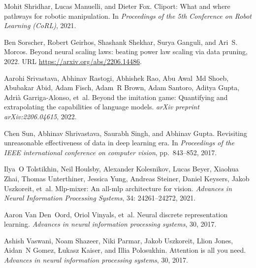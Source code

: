 \documentclass{article} %
\begin{document}
\begin{thebibliography}{61}
Mohit Shridhar, Lucas Manuelli, and Dieter Fox.
\newblock Cliport: What and where pathways for robotic manipulation.
\newblock In \emph{Proceedings of the 5th Conference on Robot Learning (CoRL)},
  2021.

Ben Sorscher, Robert Geirhos, Shashank Shekhar, Surya Ganguli, and Ari~S.
  Morcos.
\newblock Beyond neural scaling laws: beating power law scaling via data
  pruning, 2022.
\newblock URL \url{https://arxiv.org/abs/2206.14486}.

Aarohi Srivastava, Abhinav Rastogi, Abhishek Rao, Abu Awal~Md Shoeb, Abubakar
  Abid, Adam Fisch, Adam~R Brown, Adam Santoro, Aditya Gupta, Adri{\`a}
  Garriga-Alonso, et~al.
\newblock Beyond the imitation game: Quantifying and extrapolating the
  capabilities of language models.
\newblock \emph{arXiv preprint arXiv:2206.04615}, 2022.

Chen Sun, Abhinav Shrivastava, Saurabh Singh, and Abhinav Gupta.
\newblock Revisiting unreasonable effectiveness of data in deep learning era.
\newblock In \emph{Proceedings of the IEEE international conference on computer
  vision}, pp.\  843--852, 2017.

Ilya~O Tolstikhin, Neil Houlsby, Alexander Kolesnikov, Lucas Beyer, Xiaohua
  Zhai, Thomas Unterthiner, Jessica Yung, Andreas Steiner, Daniel Keysers,
  Jakob Uszkoreit, et~al.
\newblock Mlp-mixer: An all-mlp architecture for vision.
\newblock \emph{Advances in Neural Information Processing Systems},
  34: 24261--24272, 2021.

Aaron Van Den~Oord, Oriol Vinyals, et~al.
\newblock Neural discrete representation learning.
\newblock \emph{Advances in neural information processing systems}, 30, 2017.

Ashish Vaswani, Noam Shazeer, Niki Parmar, Jakob Uszkoreit, Llion Jones,
  Aidan~N Gomez, {\L}ukasz Kaiser, and Illia Polosukhin.
\newblock Attention is all you need.
\newblock \emph{Advances in neural information processing systems}, 30, 2017.


\end{thebibliography}
\end{document}

